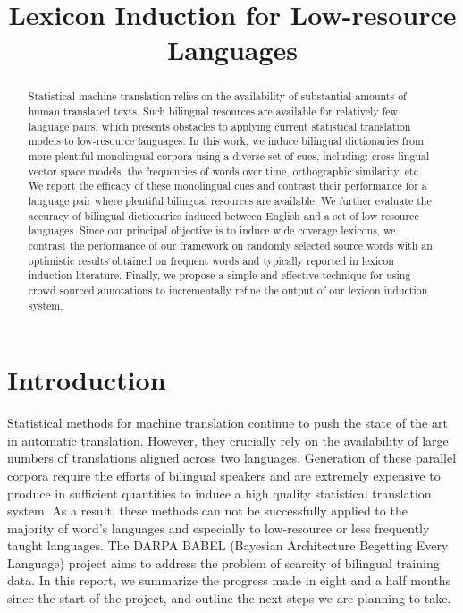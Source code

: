 \documentclass{article}
\title{Lexicon Induction for Low-resource Languages}
\newcommand{\mnote}[1]{\marginpar{%
  \vskip-\baselineskip
  \raggedright\footnotesize
  \itshape\hrule\smallskip\tiny{#1}\par\smallskip\hrule}}
\newcommand{\mtodo}[1]{\mnote{\textcolor{red}{#1}}}
\begin{document}
\maketitle

\begin{abstract}

Statistical machine translation relies on the availability of substantial amounts of human translated texts. Such bilingual resources are available for relatively few language pairs, which presents obstacles to applying current statistical translation models to low-resource languages. In this work, we induce bilingual dictionaries from more plentiful monolingual corpora using a diverse set of cues, including: cross-lingual vector space models, the frequencies of words over time, orthographic similarity, etc.  We report the efficacy of these monolingual cues and contrast their performance for a language pair where plentiful bilingual resources are available.  We further evaluate the accuracy of bilingual dictionaries induced between English and a set of low resource languages.  Since our principal objective is to induce wide coverage lexicons, we contrast the performance of our framework on randomly selected source words with an optimistic results obtained on frequent words and typically reported in lexicon induction literature.  Finally, we propose a simple and effective technique for using crowd sourced annotations to incrementally refine the output of our lexicon induction system.%
\end{abstract}

\section{Introduction}

Statistical methods for machine translation continue to push the state of the art in automatic translation. However, they crucially rely on the availability of large numbers of translations aligned across two languages. Generation of these parallel corpora require the efforts of bilingual speakers and are extremely expensive to produce in sufficient quantities to induce a high quality statistical translation system.  As a result, these methods can not be successfully applied to the majority of word's languages and especially to low-resource or less frequently taught languages.  The DARPA BABEL (Bayesian Architecture Begetting Every Language) project aims to address the problem of scarcity of bilingual training data.  In this report, we summarize the progress made in eight and a half months since the start of the project, and outline the next steps we are planning to take.\\
\end{document}

